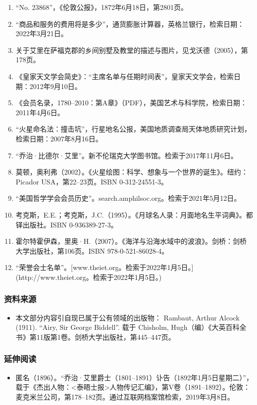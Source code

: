 \begin{enumerate}
\item “No. 23868”，《伦敦公报》，1872年6月18日，第2801页。
\item “商品和服务的费用将是多少”，通货膨胀计算器，英格兰银行，检索日期：2022年3月21日。
\item 关于艾里在萨福克郡的乡间别墅及教堂的描述与图片，见戈沃德（2005），第178页。
\item 《皇家天文学会简史》：“主席名单与任期时间表”，皇家天文学会，检索日期：2012年9月10日。
\item 《会员名录，1780–2010：第A章》（PDF），美国艺术与科学院，检索日期：2011年4月6日。
\item “火星命名法：撞击坑”，行星地名公报，美国地质调查局天体地质研究计划，检索日期：2007年8月16日。
\item “乔治·比德尔·艾里”。新不伦瑞克大学图书馆。检索于2017年11月6日。
\item 莫顿，奥利弗（2002）。《火星绘图：科学、想象与一个世界的诞生》。纽约：Picador USA，第22–23页。ISBN 0-312-24551-3。
\item “美国哲学学会会员历史”。search.amphilsoc.org。检索于2021年5月12日。
\item 考克斯，E.E.；考克斯，J.C.（1995）。《月球名人录：月面地名生平词典》。都铎出版社。ISBN 0-936389-27-3。
\item 霍尔特霍伊森，里奥·H.（2007）。《海洋与沿海水域中的波浪》。剑桥：剑桥大学出版社，第106页。ISBN 978-0-521-86028-4。
\item “荣誉会士名单”。[www.theiet.org。检索于2022年1月5日。](http://www.theiet.org。检索于2022年1月5日。)
\end{enumerate}
\subsubsection{资料来源}
\begin{itemize}
\item 本文部分内容引自现已属于公有领域的出版物：
Rambaut, Arthur Alcock (1911). “Airy, Sir George Biddell”. 载于 Chisholm, Hugh（编）《大英百科全书》第11版第1卷。剑桥大学出版社，第445–447页。
\end{itemize}
\subsubsection{延伸阅读}
\begin{itemize}
\item 匿名（1896）。“乔治·艾里爵士（1801–1891）讣告（1892年1月5日星期二）”，载于《杰出人物：<泰晤士报>人物传记汇编》，第V卷（1891–1892）。伦敦：麦克米兰公司，第178–182页。通过互联网档案馆检索，2019年3月8日。
\end{itemize}
